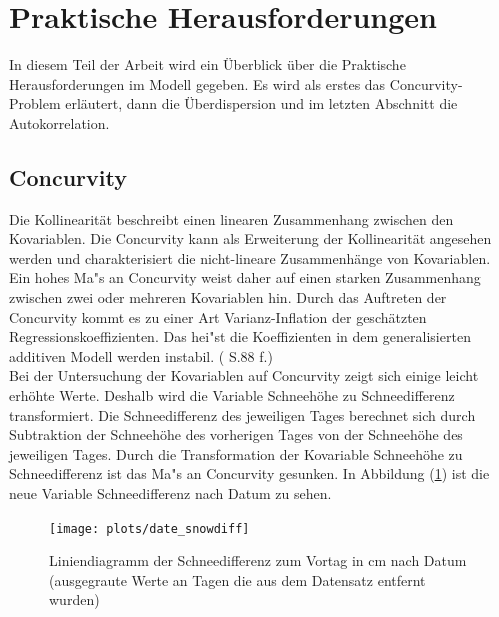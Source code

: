 \documentclass[12pt]{scrreprt}
\begin{document}
\section{Praktische Herausforderungen}
In diesem Teil der Arbeit wird ein Überblick über die Praktische Herausforderungen im Modell gegeben. Es wird als erstes das Concurvity-Problem erläutert, dann die Überdispersion und im letzten Abschnitt die Autokorrelation.

\subsection{Concurvity}
\label{chap:Concurvity}
Die Kollinearität beschreibt einen linearen Zusammenhang zwischen den Kovariablen. Die Concurvity kann als Erweiterung der Kollinearität angesehen werden und charakterisiert die nicht-lineare Zusammenhänge von Kovariablen. Ein hohes Ma"s an Concurvity weist daher auf einen starken Zusammenhang zwischen zwei oder mehreren Kovariablen hin. Durch das Auftreten der Concurvity kommt es zu einer Art Varianz-Inflation der geschätzten Regressionskoeffizienten. Das hei"st die Koeffizienten in dem generalisierten additiven Modell werden instabil. (\cite{amodio2014concurvity} S.88 f.) \\
Bei der Untersuchung der Kovariablen auf Concurvity zeigt sich einige leicht erhöhte Werte. Deshalb wird die Variable Schneehöhe zu Schneedifferenz transformiert. Die Schneedifferenz des jeweiligen Tages berechnet sich durch Subtraktion der Schneehöhe des vorherigen Tages von der Schneehöhe des jeweiligen Tages. Durch die Transformation der Kovariable Schneehöhe zu Schneedifferenz ist das Ma"s an Concurvity gesunken. In Abbildung (\ref{pic:date_snowdiff}) ist die neue Variable Schneedifferenz nach Datum zu sehen.

\begin{figure}[H]
	\centering
	\texttt{[image: plots/date\_snowdiff]}
	\caption{Liniendiagramm der Schneedifferenz zum Vortag in cm nach Datum (ausgegraute Werte an Tagen die aus dem Datensatz entfernt wurden)}
	\label{pic:date_snowdiff}	
\end{figure}
\end{document}
